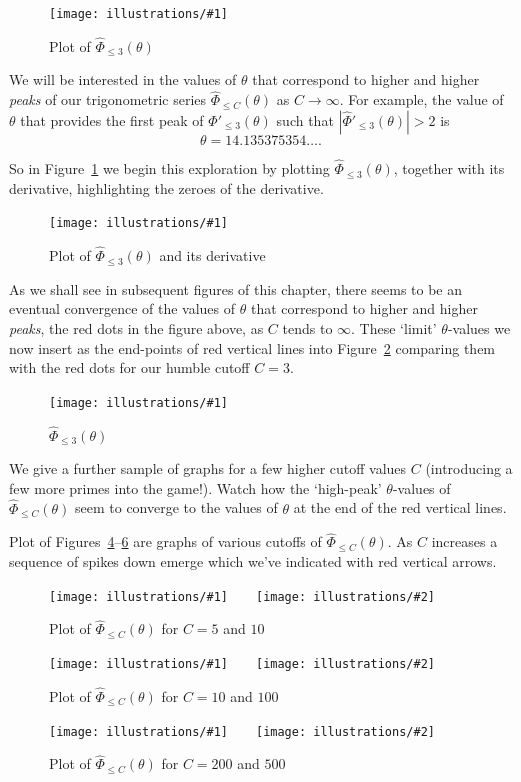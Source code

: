\documentclass[openany]{book}
\newcommand{\ill}[3]{%
   \begin{figure}[H]%
   \vspace{-2ex}
   \centering%
   \texttt{[image: illustrations/\#1]}%
   \caption{#3}%
   \vspace{-2ex}
    \end{figure}}
\newcommand{\illtwo}[4]{%
   \begin{figure}[H]\centering%
   \texttt{[image: illustrations/\#1]}$\qquad$\texttt{[image: illustrations/\#2]}%
   \caption{#4}%
    \end{figure}}
\theoremstyle{plain}
\theoremstyle{definition}
\begin{document}
{{\ill{theta_3_intro-1}{.85}{Plot of ${\hat \Phi}_{\leq 3}(\theta)$\label{fig:theta3}}


We will be interested in the values of $\theta$ that correspond to higher and higher {\it peaks} of our trigonometric series ${\hat \Phi}_{\leq C}(\theta)$ as $C\to \infty$. For example, the value of $\theta$ that provides the first peak of $
  {\hat \Phi'}_{\leq 3}(\theta)$ such that $
  |{\hat \Phi'}_{\leq 3}(\theta)| > 2$  is $$\theta=14.135375354\ldots.$$

  So in Figure~\ref{fig:theta3} we begin this exploration by plotting ${\hat \Phi}_{\leq 3}(\theta)$, together with its derivative, highlighting the zeroes of the derivative.


\ill{theta_3_intro-2}{.85}{Plot of ${\hat \Phi}_{\leq 3}(\theta)$ and its derivative\label{fig:theta4}}

As we shall see in subsequent figures of this chapter, there seems to be an eventual convergence of the values of $\theta$ that correspond to higher and higher {\it peaks}, the red dots in the figure above,  as $C$ tends to $\infty$. These `limit' $\theta$-values we now insert as the end-points of red vertical lines into Figure~\ref{fig:theta4} comparing them with the red dots for our humble cutoff $C=3$.



\ill{theta_C-3}{0.9}{${\hat \Phi}_{\leq 3}(\theta)$ \label{fig:theta5}}



We give a further sample of graphs for a few higher cutoff values $C$ (introducing a few more primes into the game!). Watch how the `high-peak' $\theta$-values of ${\hat \Phi}_{\leq C}(\theta)$ seem to converge to the values of  $\theta$ at the end of the red vertical lines.

 Plot of
Figures~\ref{fig:theta_C-5-10}--\ref{fig:theta_C-200-500}
are graphs of various cutoffs of ${\hat \Phi}_{\leq C}(\theta)$.
As $C$ increases a sequence of spikes down emerge
which we've indicated with red vertical arrows.



 \illtwo{theta_C-5}{theta_C-10}{0.45}{Plot of ${\hat \Phi}_{\leq C}(\theta)$ for $C=5$ and $10$\label{fig:theta_C-5-10}}

\illtwo{theta_C-20}{theta_C-100}{0.45}{Plot of ${\hat \Phi}_{\leq C}(\theta)$ for $C=10$ and $100$\label{fig:theta_C-10-100}}

\illtwo{theta_C-200}{theta_C-500}{0.45}{Plot of ${\hat \Phi}_{\leq C}(\theta)$ for $C=200$ and $500$\label{fig:theta_C-200-500}}


}}
\end{document}
